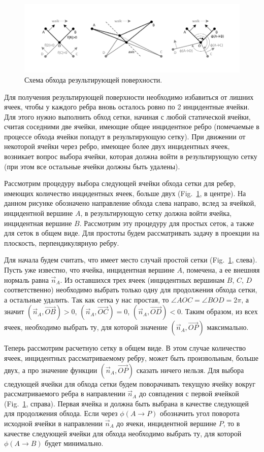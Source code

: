 \documentclass[
11pt,%
tightenlines,%
twoside,%
onecolumn,%
nofloats,%
nobibnotes,%
nofootinbib,%
superscriptaddress,%
noshowpacs,%
centertags]%
{revtex4}
\begin{document}
\begin{figure}[h]
\includegraphics[width=1.0\textwidth]{pics/pic_walk_1_size.pdf}
\caption{Схема обхода результирующей поверхности.}\label{fig:pic_walk}
\end{figure}

Для получения результирующей поверхности необходимо избавиться от лишних ячеек, чтобы у каждого ребра вновь осталось ровно по 2 инцидентные ячейки.
Для этого нужно выполнить обход сетки, начиная с любой статической ячейки, считая соседними две ячейки, имеющие общее инцидентное ребро (помечаемые в процессе обхода ячейки попадут в результирующую сетку).
При движении от некоторой ячейки через ребро, имеющее более двух инцидентных ячеек, возникает вопрос выбора ячейки, которая должна войти в результирующую сетку (при этом все остальные ячейки должны быть удалены).

Рассмотрим процедуру выбора следующей ячейки обхода сетки для ребер, имеющих количество инцидентных ячеек, больше двух (Fig.~\ref{fig:pic_walk}, в центре).
На данном рисунке обозначено направление обхода слева направо, вслед за ячейкой, инцидентной вершине $A$, в результирующую сетку должна войти ячейка, инцидентная вершине $B$.
Рассмотрим эту процедуру для простых сеток, а также для сеток в общем виде.
Для простоты будем рассматривать задачу в проекции на плоскость, перпендикулярную ребру.

Для начала будем считать, что имеет место случай простой сетки (Fig.~\ref{fig:pic_walk}, слева).
Пусть уже известно, что ячейка, инцидентная вершине $A$, помечена, а ее внешняя нормаль равна $\vec{n}_A$.
Из оставшихся трех ячеек (инцидентных вершинам $B$, $C$, $D$ соответственно) необходимо выбрать только одну для продолжения обхода сетки, а остальные удалить.
Так как сетка у нас простая, то $\angle AOC = \angle BOD = 2 \pi$, а значит $(\vec{n}_A, \vec{OB}) > 0$, $(\vec{n}_A, \vec{OC}) = 0$, $(\vec{n}_A, \vec{OD}) < 0$.
Таким образом, из всех ячеек, необходимо выбрать ту, для которой значение $(\vec{n}_A, \vec{OP})$ максимально.

Теперь рассмотрим расчетную сетку в общем виде.
В этом случае количество ячеек, инцидентных рассматриваемому ребру, может быть произвольным, больше двух, а про значение функции $(\vec{n}_A, \vec{OP})$ сказать ничего нельзя.
Для выбора следующей ячейки для обхода сетки будем поворачивать текущую ячейку вокруг рассматриваемого ребра в направлении $\vec{n}_A$ до совпадения с первой ячейкой (Fig.~\ref{fig:pic_walk}, справа).
Первая ячейка и должна быть выбрана в качестве следующей для продолжения обхода.
Если через $\phi(A \rightarrow P)$  обозначить угол поворота исходной ячейки в направлении $\vec{n}_A$ до ячеки, инцидентной вершине $P$, то в качестве следующей ячейки для обхода необходимо выбрать ту, для которой $\phi(A \rightarrow B)$ будет минимально.
\end{document}
